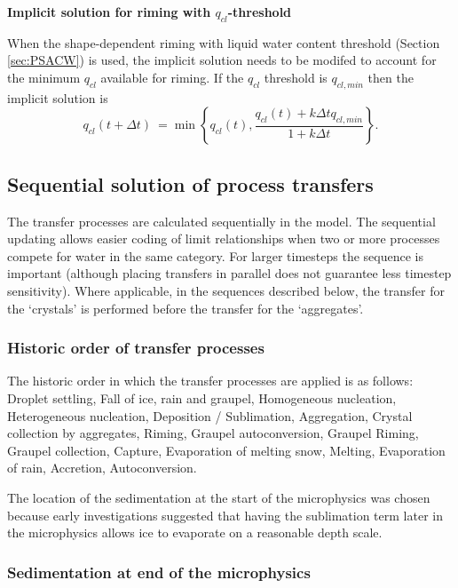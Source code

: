 \documentclass{UMDP_article}
\def\bq{\begin{equation}}
\def\eq{\end{equation}}
\begin{document}
\textbf{Implicit solution for riming with $q_{cl}$-threshold}

When the shape-dependent riming with liquid water content threshold
(Section \ref{sec:PSACW}) is used, the implicit solution needs
to be modifed to account for the minimum $q_{cl}$ available for riming.
If the $q_{cl}$ threshold is $q_{cl,min}$ then the implicit solution is
\bq
 q_{cl} (t+\Delta t) ~= \min \left\{ q_{cl}(t), \frac{q_{cl}(t)+k\Delta t q_{cl,min}}{1+k\Delta t} \right\}.
\eq

\subsection{Sequential solution of process transfers}
The transfer processes are calculated sequentially in the model. The sequential
updating allows easier coding of limit relationships when two or more processes
compete for water in the same category. For larger timesteps the sequence is
important (although placing transfers in parallel does not guarantee less timestep
sensitivity). Where applicable, in the sequences described below, the transfer for 
the `crystals' is performed before the transfer for the `aggregates'.

\subsubsection{Historic order of transfer processes}
\label{sec:historic_order}
The historic order in which the transfer processes are applied is as follows:\\
Droplet settling, Fall of ice, rain and graupel, Homogeneous nucleation, 
Heterogeneous nucleation, Deposition / Sublimation, Aggregation, 
Crystal collection by aggregates, Riming, Graupel autoconversion, Graupel Riming, 
Graupel collection, Capture, Evaporation of melting snow, Melting, Evaporation of rain, 
Accretion, Autoconversion.

The location of the sedimentation at the start of the microphysics was chosen because early
investigations suggested that having the sublimation term later in the microphysics allows
ice to evaporate on a reasonable depth scale.

\subsubsection{Sedimentation at end of the microphysics}
\label{sec:sed_at_end}
\end{document}
